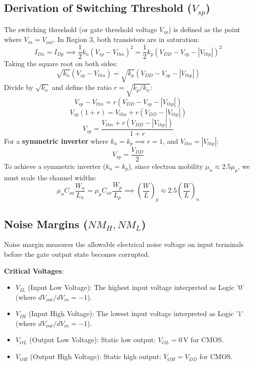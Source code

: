 \documentclass[12pt,a4paper]{article}
\begin{document}
\subsection{Derivation of Switching Threshold ($V_{sp}$)}
The switching threshold (or gate threshold voltage $V_{sp}$) is defined as the point where $V_{in} = V_{out}$. In Region 3, both transistors are in saturation:
\begin{equation}
  I_{Dn} = I_{Dp} \implies \frac{1}{2} k_n \left( V_{sp} - V_{thn} \right)^2 = \frac{1}{2} k_p \left( V_{DD} - V_{sp} - |V_{thp}| \right)^2
\end{equation}
Taking the square root on both sides:
\begin{equation}
  \sqrt{k_n} \left( V_{sp} - V_{thn} \right) = \sqrt{k_p} \left( V_{DD} - V_{sp} - |V_{thp}| \right)
\end{equation}
Divide by $\sqrt{k_n}$ and define the ratio $r = \sqrt{k_p / k_n}$:
\begin{equation}
  V_{sp} - V_{thn} = r \left( V_{DD} - V_{sp} - |V_{thp}| \right)
\end{equation}
\begin{equation}
  V_{sp} (1 + r) = V_{thn} + r \left( V_{DD} - |V_{thp}| \right)
\end{equation}
\begin{equation}
  V_{sp} = \frac{V_{thn} + r \left( V_{DD} - |V_{thp}| \right)}{1 + r}
\end{equation}
For a \textbf{symmetric inverter} where $k_n = k_p \implies r = 1$, and $V_{thn} = |V_{thp}|$:
\begin{equation}
  V_{sp} = \frac{V_{DD}}{2}
\end{equation}
To achieve a symmetric inverter ($k_n = k_p$), since electron mobility $\mu_n \approx 2.5\mu_p$, we must scale the channel widths:
\begin{equation}
  \mu_n C_{ox} \frac{W_n}{L_n} = \mu_p C_{ox} \frac{W_p}{L_p} \implies \left(\frac{W}{L}\right)_p \approx 2.5 \left(\frac{W}{L}\right)_n
\end{equation}

\subsection{Noise Margins ($NM_H, NM_L$)}
Noise margin measures the allowable electrical noise voltage on input terminals before the gate output state becomes corrupted.

\textbf{Critical Voltages}:
\begin{itemize}[leftmargin=*, itemsep=3.5pt]
  \item $V_{IL}$ (Input Low Voltage): The highest input voltage interpreted as Logic '0' (where $dV_{out}/dV_{in} = -1$).
  \item $V_{IH}$ (Input High Voltage): The lowest input voltage interpreted as Logic '1' (where $dV_{out}/dV_{in} = -1$).
  \item $V_{OL}$ (Output Low Voltage): Static low output: $V_{OL} = 0\,\text{V}$ for CMOS.
  \item $V_{OH}$ (Output High Voltage): Static high output: $V_{OH} = V_{DD}$ for CMOS.
\end{itemize}
\end{document}
